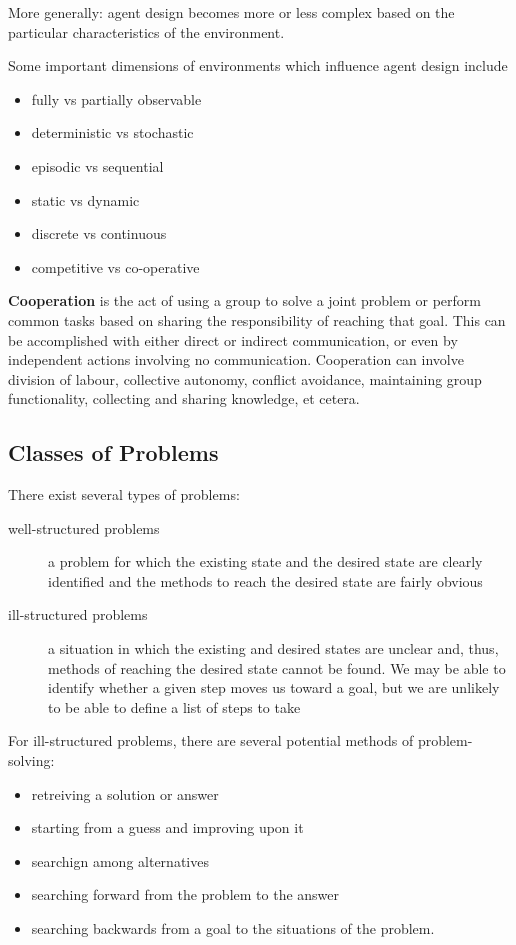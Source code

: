 \documentclass[12pt]{article}
\begin{document}
More generally: agent design becomes more or less complex based on the particular characteristics of the environment.

Some important dimensions of environments which influence agent design include
\begin{itemize}
\item fully vs partially observable
\item deterministic vs stochastic
\item episodic vs sequential
\item static vs dynamic
\item discrete vs continuous
\item competitive vs co-operative
\end{itemize}

{\bf Cooperation} is the act of using a group to solve a joint problem or perform common tasks based on sharing the responsibility of reaching that goal. This can be accomplished with either direct or indirect communication, or even by independent actions involving no communication. Cooperation can involve division of labour, collective autonomy, conflict avoidance, maintaining group functionality, collecting and sharing knowledge, et cetera.

\subsection{Classes of Problems}
There exist several types of problems:
\begin{description}
\item[well-structured problems] a problem for which the existing state and the desired state are clearly identified and the methods to reach the desired state are fairly obvious
\item[ill-structured problems] a situation in which the existing and desired states are unclear and, thus, methods of reaching the desired state cannot be found. We may be able to identify whether a given step moves us toward a goal, but we are unlikely to be able to define a list of steps to take
\end{description}

For ill-structured problems, there are several potential methods of problem-solving:
\begin{itemize}
\item retreiving a solution or answer
\item starting from a guess and improving upon it
\item searchign among alternatives
\item searching forward from the problem to the answer
\item searching backwards from a goal to the situations of the problem.
\end{itemize}
\end{document}
